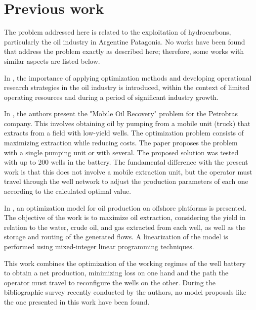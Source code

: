 \section{Previous work} \label{sec:previos} 

The problem addressed here is related to the exploitation of hydrocarbons, particularly the oil industry in Argentine Patagonia. No works have been found that address the problem exactly as described here; therefore, some works with similar aspects are listed below.

In \cite{aronofsky1962,hartsock1971}, the importance of applying optimization methods and developing operational research strategies in the oil industry is introduced, within the context of limited operating resources and during a period of significant industry growth.

In \cite{duhamel2009multicommodity}, the authors present the "Mobile Oil Recovery" problem for the Petrobras company. This involves obtaining oil by pumping from a mobile unit (truck) that extracts from a field with low-yield wells. The optimization problem consists of maximizing extraction while reducing costs. The paper proposes the problem with a single pumping unit or with several. The proposed solution was tested with up to 200 wells in the battery. The fundamental difference with the present work is that this does not involve a mobile extraction unit, but the operator must travel through the well network to adjust the production parameters of each one according to the calculated optimal value.

In \cite{langvik2012optimization}, an optimization model for oil production on offshore platforms is presented. The objective of the work is to maximize oil extraction, considering the yield in relation to the water, crude oil, and gas extracted from each well, as well as the storage and routing of the generated flows. A linearization of the model is performed using mixed-integer linear programming techniques.

This work combines the optimization of the working regimes of the well battery to obtain a net production, minimizing loss on one hand and the path the operator must travel to reconfigure the wells on the other. During the bibliographic survey recently conducted by the authors, no model proposals like the one presented in this work have been found.